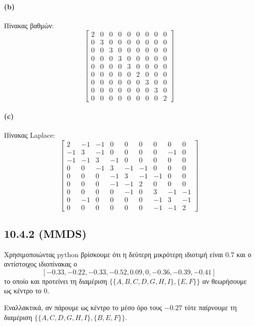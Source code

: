 \documentclass[a4paper,11pt]{article}
\begin{document}
\paragraph{(b)} Πίνακας βαθμών:
\[
	\begin{bmatrix}
		2 & 0 & 0 & 0 & 0 & 0 & 0 & 0 & 0 \\
		0 & 3 & 0 & 0 & 0 & 0 & 0 & 0 & 0 \\
		0 & 0 & 3 & 0 & 0 & 0 & 0 & 0 & 0 \\
		0 & 0 & 0 & 3 & 0 & 0 & 0 & 0 & 0 \\
		0 & 0 & 0 & 0 & 3 & 0 & 0 & 0 & 0 \\
		0 & 0 & 0 & 0 & 0 & 2 & 0 & 0 & 0 \\
		0 & 0 & 0 & 0 & 0 & 0 & 3 & 0 & 0 \\
		0 & 0 & 0 & 0 & 0 & 0 & 0 & 3 & 0 \\
		0 & 0 & 0 & 0 & 0 & 0 & 0 & 0 & 2
	\end{bmatrix}
\]

\paragraph{(c)} Πίνακας Laplace:
\[
	\begin{bmatrix}
		2 & -1 & -1 & 0 & 0 & 0 & 0 & 0 & 0 \\
		-1 & 3 & -1 & 0 & 0 & 0 & 0 & -1 & 0 \\
		-1 & -1 & 3 & -1 & 0 & 0 & 0 & 0 & 0 \\
		0 & 0 & -1 & 3 & -1 & -1 & 0 & 0 & 0 \\
		0 & 0 & 0 & -1 & 3 & -1 & -1 & 0 & 0 \\
		0 & 0 & 0 & -1 & -1 & 2 & 0 & 0 & 0 \\
		0 & 0 & 0 & 0 & -1 & 0 & 3 & -1 & -1 \\
		0 & -1 & 0 & 0 & 0 & 0 & -1 & 3 & -1 \\
		0 & 0 & 0 & 0 & 0 & 0 & -1 & -1 & 2
	\end{bmatrix}
\]

\subsection*{10.4.2 (MMDS)}

Χρησιμοποιώντας python βρίσκουμε ότι η δεύτερη μικρότερη ιδιοτιμή είναι $0.7$ και ο αντίστοιχος ιδιοπίνακας ο
\[[-0.33,-0.22,-0.33,-0.52,0.09,0,-0.36,-0.39,-0.41]\]
το οποίο και προτείνει τη διαμέριση $\{\{A,B,C,D,G,H,I\},\{E,F\}\}$ αν θεωρήσουμε ως κέντρο το $0$.

Εναλλακτικά, αν πάρουμε ως κέντρο το μέσο όρο τους $-0.27$ τότε παίρνουμε τη διαμέριση $\{\{A,C,D,G,H,I\},\{B,E,F\}\}$.
\end{document}
